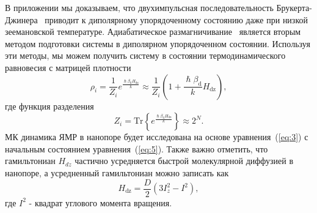 \documentclass[utf8]{jetp}
\newcommand{\hdz}{H_\mathrm{dz}}
\begin{document}
В приложении мы доказываем, что двухимпульсная последовательность Брукерта-Джинера~\cite{Goldman_1970,Jeener_1967} приводит к диполярному упорядоченному состоянию даже при низкой зеемановской температуре.
Адиабатическое размагничивание~\cite{Goldman_1970,Slichter_1961} является вторым методом подготовки системы в диполярном упорядоченном состоянии.
Используя эти методы, мы можем получить систему в состоянии термодинамического равновесия с матрицей плотности
%
\begin{equation}
    \label{eq:5}
    \rho_i = \frac{1}{Z_i} e^\frac{\hslash\beta_\mathrm{d} \hdz}{k}
    \approx \frac{1}{Z_i}(1 + \frac{\hslash\beta_\mathrm{d}}{k} H_\mathrm{dz}),
\end{equation}
%
где функция разделения
%
\begin{equation}
    \label{eq:6}
	Z_i = \mathrm{Tr} \left\{ e^\frac{\hslash\beta_\mathrm{d} \hdz}{k} \right\} \approx 2^{N}.
\end{equation}
%
МК динамика ЯМР в нанопоре будет исследована на основе уравнения~(\ref{eq:3}) с начальным состоянием уравнения~(\ref{eq:5}).
Также важно отметить, что гамильтониан $H_{dz}$ частично усредняется быстрой молекулярной диффузией в нанопоре, а усредненный гамильтониан можно записать как \cite{Fel_dman_2004,Doronin_2011}
%
\begin{equation}
    \label{eq:7}
    H_\mathrm{dz} = \dfrac{D}{2} (3 I^{2}_{z} - I^{2}) , %
\end{equation}
%
где $I^{2}$ - квадрат углового момента вращения.
\end{document}

